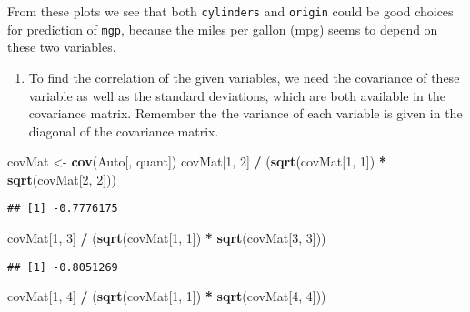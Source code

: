 \documentclass[
]{article}
\newenvironment{Shaded}{\begin{snugshade}}{\end{snugshade}}
\newcommand{\DecValTok}[1]{\textcolor[rgb]{0.00,0.00,0.81}{#1}}
\newcommand{\FunctionTok}[1]{\textcolor[rgb]{0.13,0.29,0.53}{\textbf{#1}}}
\newcommand{\NormalTok}[1]{#1}
\newcommand{\OtherTok}[1]{\textcolor[rgb]{0.56,0.35,0.01}{#1}}
\newcommand{\SpecialCharTok}[1]{\textcolor[rgb]{0.81,0.36,0.00}{\textbf{#1}}}
\providecommand{\tightlist}{%
  \setlength{\itemsep}{0pt}\setlength{\parskip}{0pt}}
\begin{document}
From these plots we see that both \texttt{cylinders} and \texttt{origin}
could be good choices for prediction of \texttt{mgp}, because the miles
per gallon (mpg) seems to depend on these two variables.

\begin{enumerate}
\def\labelenumi{\alph{enumi})}
\setcounter{enumi}{6}
\tightlist
\item
  To find the correlation of the given variables, we need the covariance
  of these variable as well as the standard deviations, which are both
  available in the covariance matrix. Remember the the variance of each
  variable is given in the diagonal of the covariance matrix.
\end{enumerate}

\begin{Shaded}
\begin{Highlighting}[]
\NormalTok{covMat }\OtherTok{\textless{}{-}} \FunctionTok{cov}\NormalTok{(Auto[, quant])}
\NormalTok{covMat[}\DecValTok{1}\NormalTok{, }\DecValTok{2}\NormalTok{] }\SpecialCharTok{/}\NormalTok{ (}\FunctionTok{sqrt}\NormalTok{(covMat[}\DecValTok{1}\NormalTok{, }\DecValTok{1}\NormalTok{]) }\SpecialCharTok{*} \FunctionTok{sqrt}\NormalTok{(covMat[}\DecValTok{2}\NormalTok{, }\DecValTok{2}\NormalTok{]))}
\end{Highlighting}
\end{Shaded}

\begin{verbatim}
## [1] -0.7776175
\end{verbatim}

\begin{Shaded}
\begin{Highlighting}[]
\NormalTok{covMat[}\DecValTok{1}\NormalTok{, }\DecValTok{3}\NormalTok{] }\SpecialCharTok{/}\NormalTok{ (}\FunctionTok{sqrt}\NormalTok{(covMat[}\DecValTok{1}\NormalTok{, }\DecValTok{1}\NormalTok{]) }\SpecialCharTok{*} \FunctionTok{sqrt}\NormalTok{(covMat[}\DecValTok{3}\NormalTok{, }\DecValTok{3}\NormalTok{]))}
\end{Highlighting}
\end{Shaded}

\begin{verbatim}
## [1] -0.8051269
\end{verbatim}

\begin{Shaded}
\begin{Highlighting}[]
\NormalTok{covMat[}\DecValTok{1}\NormalTok{, }\DecValTok{4}\NormalTok{] }\SpecialCharTok{/}\NormalTok{ (}\FunctionTok{sqrt}\NormalTok{(covMat[}\DecValTok{1}\NormalTok{, }\DecValTok{1}\NormalTok{]) }\SpecialCharTok{*} \FunctionTok{sqrt}\NormalTok{(covMat[}\DecValTok{4}\NormalTok{, }\DecValTok{4}\NormalTok{]))}
\end{Highlighting}
\end{Shaded}
\end{document}
